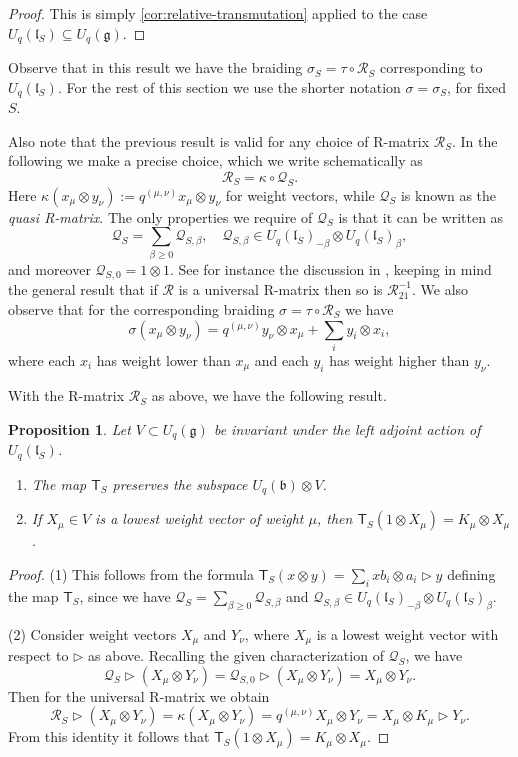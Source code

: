 \documentclass[a4paper, 12pt, reqno, english]{amsart}
\numberwithin{equation}{section}
\numberwithin{figure}{section}
\theoremstyle{plain}
\theoremstyle{plain}
\theoremstyle{plain}
\newtheorem{proposition}[theorem]{Proposition}
\theoremstyle{plain}
\theoremstyle{plain}
\theoremstyle{definition}
\theoremstyle{definition}
\theoremstyle{definition}
\theoremstyle{remark}
\theoremstyle{definition}
\theoremstyle{definition}
\newcommand{\Uqb}{U_q(\mathfrak{b})}
\newcommand{\Uqg}{U_q(\mathfrak{g})}
\newcommand{\UqlS}{U_q(\mathfrak{l}_S)}
\newcommand{\calQ}{\mathcal{Q}}
\newcommand{\calR}{\mathcal{R}}
\newcommand{\tmapS}{\mathsf{T}_S}
\begin{document}
\begin{proof}
This is simply \cref{cor:relative-transmutation} applied to the case $\UqlS \subseteq \Uqg$.
\end{proof}

Observe that in this result we have the braiding $\sigma_S = \tau \circ \calR_S$ corresponding to $\UqlS$.
For the rest of this section we use the shorter notation $\sigma = \sigma_S$, for fixed $S$.

Also note that the previous result is valid for any choice of R-matrix $\calR_S$.
In the following we make a precise choice, which we write schematically as
\[
\calR_S = \kappa \circ \calQ_S.
\]
Here $\kappa(x_\mu \otimes y_\nu) := q^{(\mu, \nu)} x_\mu \otimes y_\nu$ for weight vectors, while $\calQ_S$ is known as the \emph{quasi R-matrix}.
The only properties we require of $\calQ_S$ is that it can be written as
\[
\calQ_S = \sum_{\beta \geq 0} \calQ_{S, \beta}, \quad
\calQ_{S, \beta} \in \UqlS_{- \beta} \otimes \UqlS_\beta,
\]
and moreover $\calQ_{S, 0} = 1 \otimes 1$.
See for instance the discussion in \cite[Section 7]{jantzen}, keeping in mind the general result that if $\calR$ is a universal R-matrix then so is $\calR_{2 1}^{-1}$.
We also observe that for the corresponding braiding $\sigma = \tau \circ \calR_S$ we have
\[
\sigma(x_\mu \otimes y_\nu) = q^{(\mu, \nu)} y_\nu \otimes x_\mu + \sum_i y_i \otimes x_i,
\]
where each $x_i$ has weight lower than $x_\mu$ and each $y_i$ has weight higher than $y_\nu$.

With the R-matrix $\calR_S$ as above, we have the following result.

\begin{proposition}
\label{prop:properties-T}
Let $V \subset \Uqg$ be invariant under the left adjoint action of $\UqlS$.

\begin{enumerate}
\item The map $\tmapS$ preserves the subspace $\Uqb \otimes V$.
\item If $X_\mu \in V$ is a lowest weight vector of weight $\mu$, then $\tmapS(1 \otimes X_\mu) = K_\mu \otimes X_\mu$.
\end{enumerate}
\end{proposition}

\begin{proof}
(1) This follows from the formula $\tmapS(x \otimes y) = \sum_i x b_i \otimes a_i \triangleright y$ defining the map $\tmapS$, since we have $\calQ_S = \sum_{\beta \geq 0} \calQ_{S, \beta}$ and $\calQ_{S, \beta} \in \UqlS_{- \beta} \otimes \UqlS_\beta$.

(2) Consider weight vectors $X_\mu$ and $Y_\nu$, where $X_\mu$ is a lowest weight vector with respect to $\triangleright$ as above.
Recalling the given characterization of $\calQ_S$, we have
\[
\calQ_S \triangleright (X_\mu \otimes Y_\nu) = \calQ_{S, 0} \triangleright (X_\mu \otimes Y_\nu) = X_\mu \otimes Y_\nu.
\]
Then for the universal R-matrix we obtain
\[
\calR_S \triangleright (X_\mu \otimes Y_\nu) = \kappa (X_\mu \otimes Y_\nu) = q^{(\mu, \nu)} X_\mu \otimes Y_\nu = X_\mu \otimes K_\mu \triangleright Y_\nu.
\]
From this identity it follows that $\tmapS(1 \otimes X_\mu) = K_\mu \otimes X_\mu$.
\end{proof}
\end{document}
